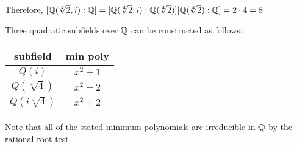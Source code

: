 \documentclass[letterpaper,12pt,fleqn]{article}
\begin{document}
\begin{enumerate}

  Therefore, $[\mathbb{Q}(\sqrt[4]{2},i):\mathbb{Q}]=[\mathbb{Q}(\sqrt[4]{2},i):\mathbb{Q}(\sqrt[4]{2})][\mathbb{Q}(\sqrt[4]{2}):\mathbb{Q}]=2\cdot4=8$

  Three quadratic subfields over $\mathbb{Q}$ can be constructed as follows:

  \begin{tabular}{|c|c|}
    \hline
    subfield & min poly \\
    \hline
    $Q(i)$ & $x^2+1$ \\
    \hline
    $Q(\sqrt[4]{4})$ & $x^2-2$ \\
    \hline
    $Q(i\sqrt[4]{4})$ & $x^2+2$ \\
    \hline
  \end{tabular}

  Note that all of the stated minimum polynomials are irreducible in $\mathbb{Q}$ by
  the rational root test.
\end{enumerate}
\end{document}
